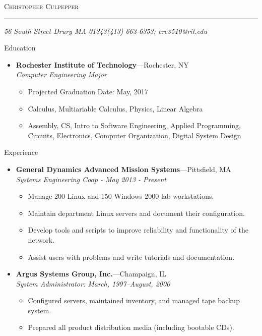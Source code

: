 \documentclass[11pt,oneside]{article}
\makeatletter
\newcommand{\name}{Christopher Culpepper}
\newcommand{\addr}{56 South Street Drury MA 01343}
\newcommand{\phone}{(413) 663-6353}
\newcommand{\email}{crc3510@rit.edu}
\newcommand{\bigname}[1]{
	\begin{center}\fontfamily{phv}\selectfont\Huge\scshape#1\end{center}
}
\newenvironment{ressection}[1]{
	\vspace{4pt}
	{\fontfamily{phv}\selectfont\Large#1}
	\begin{itemize}
	\vspace{3pt}
}{
	\end{itemize}
}
\newcommand{\ressubitem}[1]{
	\vspace{-1pt}
	\item \begin{flushleft} #1 \end{flushleft}
}
\newcommand{\resbigitem}[3]{
	\vspace{-5pt}
	\item
	\textbf{#1}---#2 \\
	\textit{#3}
}
\newenvironment{ressubsec}[3]{
	\resbigitem{#1}{#2}{#3}
	\vspace{-2pt}
	\begin{itemize}
}{
	\end{itemize}
}
\makeatother
\begin{document}
 \selectfont

\bigname{\name}

\vspace{-8pt} \rule{\textwidth}{1pt}

\vspace{-1pt} {\small\itshape \addr \hfill \phone; \email}

\vspace{8 pt}




\begin{ressection}{Education}

	\begin{ressubsec}{Rochester Institute of Technology}{Rochester, NY}{Computer Engineering Major}
		\ressubitem{Projected Graduation Date: May, 2017}
		\ressubitem{Calculus, Multiariable Calculus, Physics, Linear Algebra}
		\ressubitem{Assembly, CS, Intro to Software Engineering, Applied Programming, Circuits, Electronics, Computer Organization, Digital System Design}
	\end{ressubsec}

\end{ressection}


\begin{ressection}{Experience}

	\begin{ressubsec}{General Dynamics Advanced Mission Systems}{Pittsfield, MA}{Systems Engineering Coop - May 2013 - Present}
		\ressubitem{Manage 200 Linux and 150 Windows 2000 lab workstations.}
		\ressubitem{Maintain department Linux servers and document their configuration.}
		\ressubitem{Develop tools and scripts to improve reliability and functionality of the network.}
		\ressubitem{Assist users with problems and write tutorials and documentation.}
	\end{ressubsec}

	\begin{ressubsec}{Argus Systems Group, Inc.}{Champaign, IL}{System Administrator: March, 1997--August, 2000}
		\ressubitem{Configured servers, maintained inventory, and managed tape backup system.}
		\ressubitem{Prepared all product distribution media (including bootable CDs).}
	\end{ressubsec}

\end{ressection}
\end{document}
